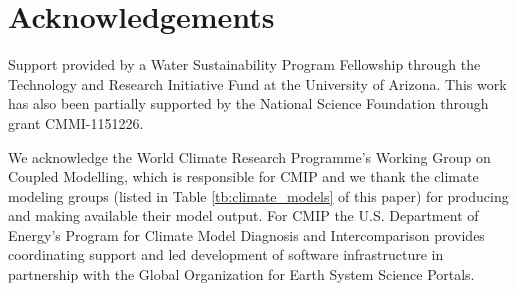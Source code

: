\documentclass[11pt]{article}
\theoremstyle{plain}
\theoremstyle{definition}
\theoremstyle{remark}
\begin{document}
\section*{Acknowledgements}
Support provided by a Water Sustainability Program Fellowship through the Technology and Research Initiative Fund at the University of Arizona.
This work has also been partially supported by the National Science Foundation through grant CMMI-1151226.

We acknowledge the World Climate Research Programme's Working Group on Coupled Modelling, which is responsible for CMIP and we thank the climate modeling groups (listed in Table \ref{tb:climate_models} of this paper) for producing and making available their model output.
For CMIP the U.S. Department of Energy's Program for Climate Model Diagnosis and Intercomparison provides coordinating support and led development of software infrastructure in partnership with the Global Organization for Earth System Science Portals.



\end{document}

